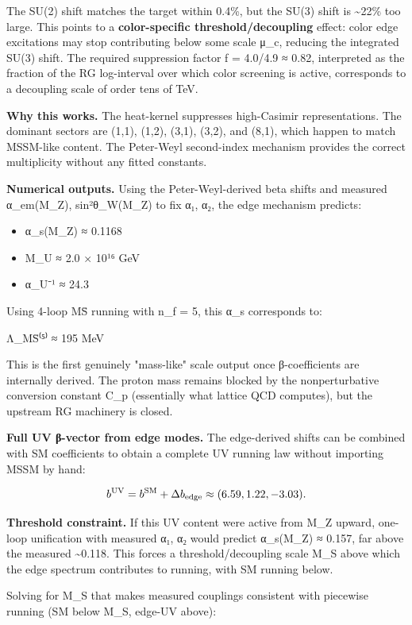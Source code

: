 The SU(2) shift matches the target within 0.4\%, but the SU(3) shift is \textasciitilde22\% too large. This points to a \textbf{color-specific threshold/decoupling} effect: color edge excitations may stop contributing below some scale μ\_c, reducing the integrated SU(3) shift. The required suppression factor f = 4.0/4.9 ≈ 0.82, interpreted as the fraction of the RG log-interval over which color screening is active, corresponds to a decoupling scale of order tens of TeV.

\textbf{Why this works.} The heat-kernel suppresses high-Casimir representations. The dominant sectors are (1,1), (1,2), (3,1), (3,2), and (8,1), which happen to match MSSM-like content. The Peter-Weyl second-index mechanism provides the correct multiplicity without any fitted constants.

\textbf{Numerical outputs.} Using the Peter-Weyl-derived beta shifts and measured α\_em(M\_Z), sin²θ\_W(M\_Z) to fix α₁, α₂, the edge mechanism predicts:

\begin{itemize}
\tightlist
\item
  α\_s(M\_Z) ≈ 0.1168
\item
  M\_U ≈ 2.0 × 10¹⁶ GeV
\item
  α\_U⁻¹ ≈ 24.3
\end{itemize}

Using 4-loop M\={S} running with n\_f = 5, this α\_s corresponds to:

Λ\_M\={S}⁽⁵⁾ ≈ 195 MeV

This is the first genuinely "mass-like" scale output once β-coefficients are internally derived. The proton mass remains blocked by the nonperturbative conversion constant C\_p (essentially what lattice QCD computes), but the upstream RG machinery is closed.

\textbf{Full UV β-vector from edge modes.} The edge-derived shifts can be combined with SM coefficients to obtain a complete UV running law without importing MSSM by hand:

\[
b^{\rm UV} = b^{\rm SM} + \Delta b_{\rm edge} \approx (6.59, 1.22, -3.03).
\]

\textbf{Threshold constraint.} If this UV content were active from M\_Z upward, one-loop unification with measured α₁, α₂ would predict α\_s(M\_Z) ≈ 0.157, far above the measured \textasciitilde0.118. This forces a threshold/decoupling scale M\_S above which the edge spectrum contributes to running, with SM running below.

Solving for M\_S that makes measured couplings consistent with piecewise running (SM below M\_S, edge-UV above):

